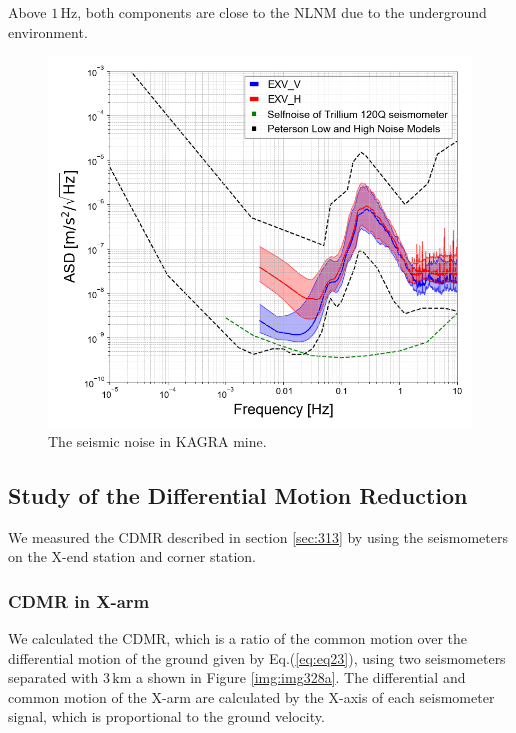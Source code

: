 Above $1\,\mathrm{Hz}$, both components are close to the NLNM due to the underground environment.

\begin{figure}[h]
  \includegraphics[width=13.0cm]{./img_chap3/img313.png}
  \caption{ The seismic noise in KAGRA mine.}\label{img:img313}
\end{figure}



\subsection{Study of the Differential Motion Reduction} \label{sec:332}
We measured the CDMR described in section \cref{sec:313} by using the seismometers on the X-end station and corner station.
\subsubsection{CDMR in X-arm }
We calculated the CDMR, which is a ratio of the common motion over the differential motion of the ground given by Eq.(\ref{eq:eq23}), using two seismometers separated with $3\,\mathrm{km}$ a shown in Figure \ref{img:img328a}. The differential and common motion of the X-arm are calculated by the X-axis of each seismometer signal, which is proportional to the ground velocity. 

